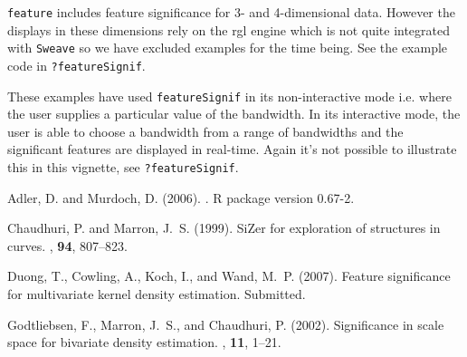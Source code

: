 \documentclass[a4paper,11pt]{article}
\begin{document}
\texttt{feature} includes 
feature significance for 3- and 4-dimensional
data. However the displays in these dimensions rely on the rgl engine
\citep{rgl} which is not quite integrated with \texttt{Sweave} 
so we have excluded examples for the time being. See 
the example code in \texttt{?featureSignif}.   

These examples have used \texttt{featureSignif} in its non-interactive
mode i.e. where the user supplies a particular value of the bandwidth. 
In its interactive mode, the user is able to choose a
bandwidth from a range of bandwidths and the significant features are
displayed in real-time.
Again it's not possible to illustrate this in this vignette,
see \texttt{?featureSignif}.   
 



%

\begin{thebibliography}{}

Adler, D. and Murdoch, D. (2006).
.
\newblock R package version 0.67-2.

Chaudhuri, P. and Marron, J.~S. (1999).
\newblock Si{Z}er for exploration of structures in curves.
, \textbf{94}, 807--823.

Duong, T., Cowling, A., Koch, I., and Wand, M.~P. (2007).
\newblock Feature significance for multivariate kernel density estimation.
\newblock Submitted.

Godtliebsen, F., Marron, J.~S., and Chaudhuri, P. (2002).
\newblock Significance in scale space for bivariate density estimation.
, \textbf{11}, 1--21.

\end{thebibliography}
\end{document}
